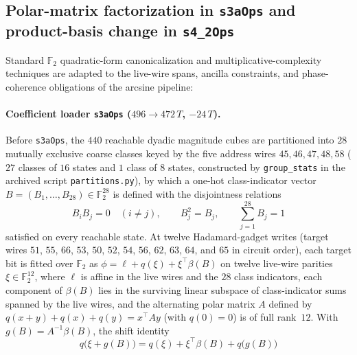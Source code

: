 \documentclass[11pt,a4paper]{article}
\theoremstyle{definition}
\theoremstyle{remark}
\begin{document}
\subsection{Polar-matrix factorization in \texttt{s3aOps} and product-basis change in \texttt{s4\_2Ops}}

Standard \(\mathbb{F}_2\) quadratic-form canonicalization and multiplicative-complexity techniques \cite{schnorr1989,mirwald1992,calik2020} are adapted to the live-wire spans, ancilla constraints, and phase-coherence obligations of the arcsine pipeline:

\paragraph{Coefficient loader \texttt{s3aOps} (\(496 \to 472\,T\), \(-24\,T\)).}
Before \texttt{s3aOps}, the \(440\) reachable dyadic magnitude cubes are partitioned into \(28\) mutually exclusive coarse classes keyed by the five address wires \(45, 46, 47, 48, 58\) (\(27\) classes of \(16\) states and \(1\) class of \(8\) states, constructed by \texttt{group\_stats} in the archived script \texttt{partitions.py}), by which a one-hot class-indicator vector \(B = (B_1, \dots, B_{28}) \in \mathbb{F}_2^{28}\) is defined with the disjointness relations
\[
  B_i B_j = 0 \quad (i \ne j), \qquad B_j^2 = B_j, \qquad \sum_{j=1}^{28} B_j = 1
\]
satisfied on every reachable state. At twelve Hadamard-gadget writes (target wires \(51\), \(55\), \(66\), \(53\), \(50\), \(52\), \(54\), \(56\), \(62\), \(63\), \(64\), and \(65\) in circuit order), each target bit is fitted over \(\mathbb{F}_2\) as \(\phi = \ell + q(\xi) + \xi^\top \beta(B)\) on twelve live-wire parities \(\xi \in \mathbb{F}_2^{12}\), where \(\ell\) is affine in the live wires and the \(28\) class indicators, each component of \(\beta(B)\) lies in the surviving linear subspace of class-indicator sums spanned by the live wires, and the alternating polar matrix \(A\) defined by \(q(x+y)+q(x)+q(y) = x^\top A y\) (with \(q(0)=0\)) is of full rank~\(12\). With \(g(B) = A^{-1}\beta(B)\), the shift identity
\[
  q\bigl(\xi + g(B)\bigr) = q(\xi) + \xi^\top \beta(B) + q\bigl(g(B)\bigr)
\]
\end{document}
